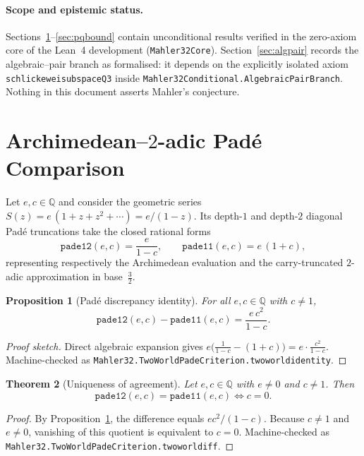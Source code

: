 \documentclass[11pt,a4paper]{article}
\newtheorem{theorem}{Theorem}[section]
\newtheorem{proposition}[theorem]{Proposition}
\theoremstyle{remark}
\newcommand{\Q}{\mathbb{Q}}
\renewcommand{\_}{\textunderscore\allowbreak}
\newcommand{\lean}[1]{\texttt{#1}}
\begin{document}
\paragraph{Scope and epistemic status.}
Sections~\ref{sec:padeworlds}--\ref{sec:pqbound} contain unconditional results verified in the zero-axiom core of the Lean~4 development (\lean{Mahler32Core}). Section~\ref{sec:algpair} records the algebraic--pair branch as formalised: it depends on the explicitly isolated axiom \lean{schlickewei\_subspace\_Q3} inside \lean{Mahler32Conditional.\allowbreak AlgebraicPairBranch}. Nothing in this document asserts Mahler's conjecture.

\section{Archimedean--\texorpdfstring{$2$}{2}-adic Pad\'e Comparison}
\label{sec:padeworlds}

Let $e,c\in\Q$ and consider the geometric series $S(z)=e\,(1+z+z^2+\cdots)=e/(1-z)$. Its depth-$1$ and depth-$2$ diagonal Pad\'e truncations take the closed rational forms
\begin{equation}
  \lean{pade12}(e,c)=\frac{e}{1-c},
  \qquad
  \lean{pade11}(e,c)=e\,(1+c),
\end{equation}
representing respectively the Archimedean evaluation and the carry-truncated $2$-adic approximation in base~$\tfrac32$.

\begin{proposition}[Pad\'e discrepancy identity]
\label{prop:identity}
For all $e,c\in\Q$ with $c\neq 1$,
\begin{equation}
  \lean{pade12}(e,c)-\lean{pade11}(e,c)=\frac{e\,c^{2}}{1-c}.
\end{equation}
\end{proposition}

\begin{proof}[Proof sketch]
Direct algebraic expansion gives $e\bigl(\tfrac{1}{1-c}-(1+c)\bigr)=e\cdot\tfrac{c^2}{1-c}$. Machine-checked as \lean{Mahler32.\allowbreak TwoWorldPadeCriterion.\allowbreak two\_world\_identity}.
\end{proof}

\begin{theorem}[Uniqueness of agreement]
\label{thm:iff}
Let $e,c\in\Q$ with $e\neq 0$ and $c\neq 1$. Then
\[
  \lean{pade12}(e,c)=\lean{pade11}(e,c)\iff c=0 .
\]
\end{theorem}

\begin{proof}
By Proposition~\ref{prop:identity}, the difference equals $ec^2/(1-c)$. Because $c\neq1$ and $e\neq0$, vanishing of this quotient is equivalent to $c=0$. Machine-checked as \lean{Mahler32.\allowbreak TwoWorldPadeCriterion.\allowbreak two\_world\_iff}.
\end{proof}
\end{document}

